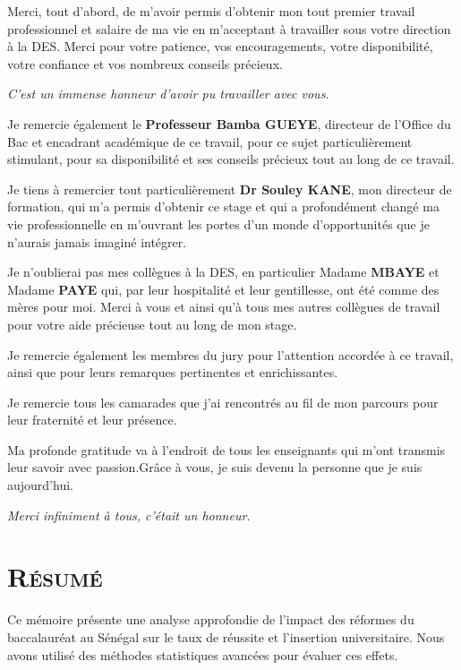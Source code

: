 \documentclass[a4paper,12pt]{report}                %
\begin{document}
    Merci, tout d’abord, de m’avoir permis d’obtenir mon tout premier travail professionnel et salaire de ma vie en m’acceptant à travailler sous votre direction à la DES. Merci pour votre patience, vos encouragements, 
    votre disponibilité, votre confiance et vos nombreux conseils précieux.

    \textit{C’est un immense honneur d’avoir pu travailler avec vous.}

    \medskip

    Je remercie également le \textbf{Professeur Bamba GUEYE}, directeur de l’Office du Bac et encadrant académique de ce travail, pour ce sujet particulièrement stimulant, pour sa disponibilité et ses conseils précieux tout au long de ce travail.

    \medskip

    Je tiens à remercier tout particulièrement \textbf{Dr Souley KANE}, mon directeur de formation, qui m’a permis d’obtenir ce stage et qui a profondément changé ma vie professionnelle en m’ouvrant les portes d’un monde d’opportunités que je n’aurais jamais imaginé intégrer.

    \medskip

    Je n’oublierai pas mes collègues à la DES, en particulier Madame \textbf{MBAYE} et Madame \textbf{PAYE} qui, par leur hospitalité et leur gentillesse, ont été comme des mères pour moi.
    Merci à vous et ainsi qu’à tous mes autres collègues de travail pour votre aide précieuse tout au long de mon stage.

    \medskip

    Je remercie également les membres du jury pour l’attention accordée à ce travail, ainsi que pour leurs remarques pertinentes et enrichissantes.

    \medskip

    Je remercie tous les camarades que j’ai rencontrés au fil de mon parcours pour leur fraternité et leur présence.

    \medskip

    Ma profonde gratitude va à l’endroit de tous les enseignants qui m’ont transmis leur savoir avec passion.Grâce à vous, je suis devenu la personne que je suis aujourd’hui.
    
    \vspace{1cm}
    
    \textit{Merci infiniment à tous, c'était un honneur.}

    \newpage
    \section*{\textsc{Résumé}}
    Ce mémoire présente une analyse approfondie de l'impact des réformes du baccalauréat au Sénégal sur le taux de réussite et l'insertion universitaire. Nous avons utilisé des méthodes statistiques avancées pour évaluer ces effets.
    
\end{document}
